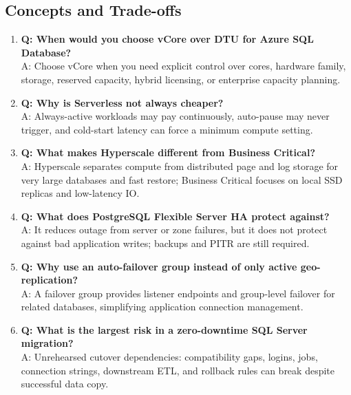 \subsection{Concepts and Trade-offs}
\begin{enumerate}
    \item \textbf{Q: When would you choose vCore over DTU for Azure SQL Database?}\\
    A: Choose vCore when you need explicit control over cores, hardware family, storage, reserved capacity, hybrid licensing, or enterprise capacity planning.
    \item \textbf{Q: Why is Serverless not always cheaper?}\\
    A: Always-active workloads may pay continuously, auto-pause may never trigger, and cold-start latency can force a minimum compute setting.
    \item \textbf{Q: What makes Hyperscale different from Business Critical?}\\
    A: Hyperscale separates compute from distributed page and log storage for very large databases and fast restore; Business Critical focuses on local SSD replicas and low-latency IO.
    \item \textbf{Q: What does PostgreSQL Flexible Server HA protect against?}\\
    A: It reduces outage from server or zone failures, but it does not protect against bad application writes; backups and PITR are still required.
    \item \textbf{Q: Why use an auto-failover group instead of only active geo-replication?}\\
    A: A failover group provides listener endpoints and group-level failover for related databases, simplifying application connection management.
    \item \textbf{Q: What is the largest risk in a zero-downtime SQL Server migration?}\\
    A: Unrehearsed cutover dependencies: compatibility gaps, logins, jobs, connection strings, downstream ETL, and rollback rules can break despite successful data copy.
\end{enumerate}

